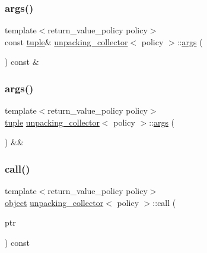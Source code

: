 \subsubsection{\texorpdfstring{args()}{args()}\hspace{0.1cm}{\footnotesize\ttfamily [1/2]}}
{\footnotesize\ttfamily template$<$return\+\_\+value\+\_\+policy policy$>$ \\
const \mbox{\hyperlink{classtuple}{tuple}}\& \mbox{\hyperlink{classunpacking__collector}{unpacking\+\_\+collector}}$<$ policy $>$\+::\mbox{\hyperlink{classargs}{args}} (\begin{DoxyParamCaption}{ }\end{DoxyParamCaption}) const \&\hspace{0.3cm}{\ttfamily [inline]}}

\mbox{\label{classunpacking__collector_a9905f0fd4b68ab18f9df1fc495f369a9}} 
\subsubsection{\texorpdfstring{args()}{args()}\hspace{0.1cm}{\footnotesize\ttfamily [2/2]}}
{\footnotesize\ttfamily template$<$return\+\_\+value\+\_\+policy policy$>$ \\
\mbox{\hyperlink{classtuple}{tuple}} \mbox{\hyperlink{classunpacking__collector}{unpacking\+\_\+collector}}$<$ policy $>$\+::\mbox{\hyperlink{classargs}{args}} (\begin{DoxyParamCaption}{ }\end{DoxyParamCaption}) \&\&\hspace{0.3cm}{\ttfamily [inline]}}

\mbox{\label{classunpacking__collector_a3df5e4ecbc1a9fd31788c59053444de3}} 
\subsubsection{\texorpdfstring{call()}{call()}}
{\footnotesize\ttfamily template$<$return\+\_\+value\+\_\+policy policy$>$ \\
\mbox{\hyperlink{classobject}{object}} \mbox{\hyperlink{classunpacking__collector}{unpacking\+\_\+collector}}$<$ policy $>$\+::call (\begin{DoxyParamCaption}\item[{\mbox{\hyperlink{_python27_2object_8h_aadc84ac7aed2cfa6f20c25f62bf3dac7}{Py\+Object}} $\ast$}]{ptr }\end{DoxyParamCaption}) const\hspace{0.3cm}{\ttfamily [inline]}}



